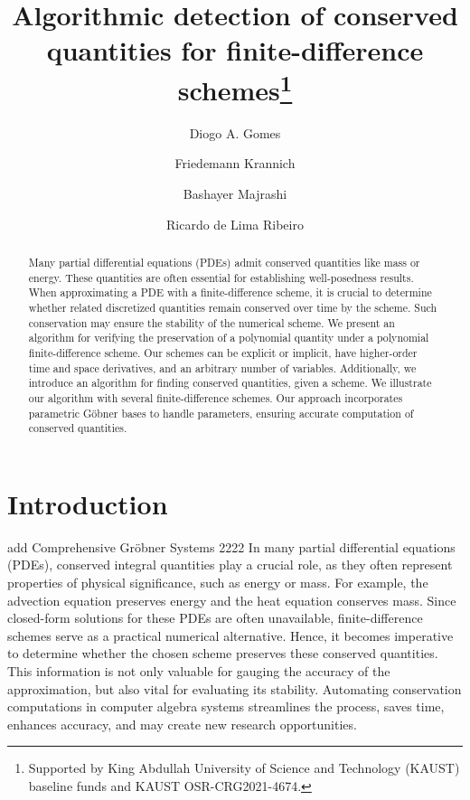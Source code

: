 \documentclass[runningheads]{llncs}
\newcommand{\1}{\chi}
\begin{document}
\title{Algorithmic detection of conserved quantities for finite-difference schemes\thanks{Supported by King Abdullah University of Science and Technology (KAUST) baseline funds and KAUST OSR-CRG2021-4674.}}
\author{Diogo A. Gomes \and
	Friedemann Krannich \and
	Bashayer Majrashi \and
	Ricardo de Lima Ribeiro}
\maketitle
\begin{abstract}
	Many partial differential equations (PDEs) admit conserved quantities like mass or energy. These quantities are often essential for establishing well-posedness results. When approximating a PDE with a finite-difference scheme, it is crucial to determine whether related discretized quantities remain conserved over time by the scheme. Such conservation may ensure the stability of the numerical scheme. We present an algorithm for verifying the preservation of a polynomial quantity under a polynomial finite-difference scheme. Our schemes can be explicit or implicit, have higher-order time and space derivatives, and an arbitrary number of variables. Additionally, we introduce an algorithm for finding conserved quantities, given a scheme. We illustrate our algorithm with several finite-difference schemes. Our approach incorporates parametric G\"obner bases to handle parameters, ensuring accurate computation of conserved quantities.
	
	
\end{abstract}

\section{Introduction}
{\color{blue} add 
Comprehensive Gr{\"o}bner Systems 2222
}
In many partial differential equations (PDEs), conserved integral quantities play a crucial role, as they often represent properties of physical significance, such as energy or mass. For example, the advection equation preserves energy and the heat equation conserves mass. 
Since closed-form solutions for these PDEs are often unavailable, finite-difference schemes serve as a practical numerical alternative. Hence, it becomes imperative to determine whether the chosen scheme preserves these conserved quantities. This information is not only valuable for gauging the accuracy of the approximation, but also vital for evaluating its stability. Automating conservation computations in computer algebra systems streamlines the process, saves time, enhances accuracy, and may create new research opportunities.
\end{document}
